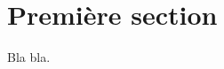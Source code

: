 \documentclass{article}
\author{Paulo Gugelmo Cavalheiro Dias}
\begin{document}
\maketitle

\section{Première section}

Bla bla. 
\end{document}
